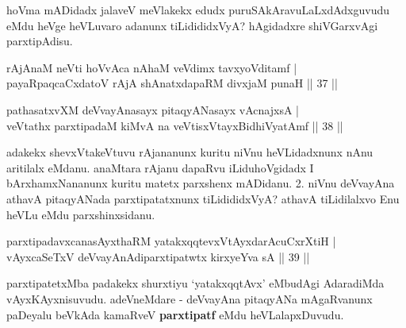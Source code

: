 \begin{artha}
hoVma mADidadx jalaveV meVlakekx edudx puruSAkAravuLaLxdAdxguvudu eMdu heVge heVLuvaro adanunx tiLidididxVyA? hAgidadxre shiVGarxvAgi parxtipAdisu.
\end{artha}

\begin{shl}
rAjAnaM neVti hoVvAca nAhaM veVdimx tavxyoVditamf | \\
payaRpaqcaCxdatoV rAjA shAnatxdapaRM divxjaM punaH \hfill|| 37 || 
\end{shl}

\begin{shl}
pathasatxvXM deVvayAnasayx pitaqyANasayx vA\s cnajxsA | \\
veVtathx parxtipadaM kiMvA na veVtisxVtayxBidhiVyatAmf \hfill|| 38 || 
\end{shl}

\begin{artha}
adakekx shevxVtakeVtuvu rAjananunx kuritu niVnu heVLidadxnunx nAnu 
aritilalx eMdanu. anaMtara rAjanu dapaRvu iLiduhoVgidadx I 
bArxhamxNananunx kuritu matetx parxshenx mADidanu. 2. niVnu deVvayAna 
athavA pitaqyANada parxtipatatxnunx tiLidididxVyA? athavA tiLidilalxvo 
Enu heVLu eMdu parxshinxsidanu.
\end{artha}


\begin{shl}
parxtipadavxcanasAyxthaRM \footnotemark[1]yatakxqqtevxVtAyxdarAcuCxrXtiH | \\
vAyxcaSeTxV deVvayAnAdiparxtipatwtx \footnotemark[2]kirxyeYva sA \hfill|| 39 || 
\end{shl}
\footnotetext[2]{}

\begin{artha}
parxtipatetxMba padakekx shurxtiyu `yatakxqqtAvx' eMbudAgi AdaradiMda 
vAyxKAyxni\-suvudu. adeVneMdare - deVvayAna pitaqyANa mAgaRvanunx 
paDeyalu beVkAda kamaRveV \textbf{parxtipatf} eMdu heVLalapxDuvudu.
\end{artha}


